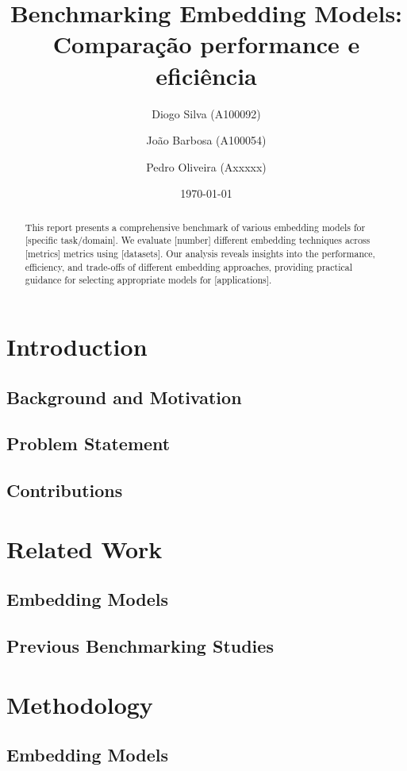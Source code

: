\documentclass[12pt,a4paper]{article}
\title{Benchmarking Embedding Models: Comparação performance e eficiência}
\author{Diogo Silva (A100092) \and João Barbosa (A100054) \and Pedro Oliveira (Axxxxx)}
\date{\today}
\begin{document}
\maketitle

\begin{abstract}
This report presents a comprehensive benchmark of various embedding models for [specific task/domain]. We evaluate [number] different embedding techniques across [metrics] metrics using [datasets]. Our analysis reveals insights into the performance, efficiency, and trade-offs of different embedding approaches, providing practical guidance for selecting appropriate models for [applications].
\end{abstract}

\tableofcontents
\newpage

\section{Introduction}
\subsection{Background and Motivation}
\subsection{Problem Statement}
\subsection{Contributions}

\section{Related Work}
\subsection{Embedding Models}
\subsection{Previous Benchmarking Studies}

\section{Methodology}
\subsection{Embedding Models}
\end{document}
